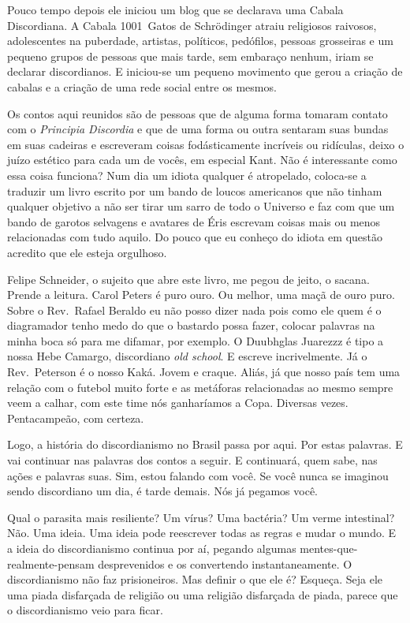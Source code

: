 Pouco tempo depois ele iniciou um blog que se declarava uma Cabala Discordiana. A Cabala 1001~Gatos de Schrödinger atraiu religiosos raivosos, adolescentes na puberdade, artistas, políticos, pedófilos, pessoas grosseiras e um pequeno grupos de pessoas que mais tarde, sem embaraço nenhum, iriam se declarar discordianos. E iniciou-se um pequeno movimento que gerou a criação de cabalas e a criação de uma rede social entre os mesmos.

Os contos aqui reunidos são de pessoas que de alguma forma tomaram contato com o \emph{Principia Discordia} e que de uma forma ou outra sentaram suas bundas em suas cadeiras e escreveram coisas fodásticamente incríveis ou ridículas, deixo o juízo estético para cada um de vocês, em especial Kant. Não é interessante como essa coisa funciona? Num dia um idiota qualquer é atropelado, coloca-se a traduzir um livro escrito por um bando de loucos americanos que não tinham qualquer objetivo a não ser tirar um sarro de todo o Universo e faz com que um bando de garotos selvagens e avatares de Éris escrevam coisas mais ou menos relacionadas com tudo aquilo. Do pouco que eu conheço do idiota em questão acredito que ele esteja orgulhoso.

Felipe Schneider, o sujeito que abre este livro, me pegou de jeito, o sacana. Prende a leitura. Carol Peters é puro ouro. Ou melhor, uma maçã de ouro puro. Sobre o Rev.~Rafael Beraldo eu não posso dizer nada pois como ele quem é o diagramador tenho medo do que o bastardo possa fazer, colocar palavras na minha boca só para me difamar, por exemplo. O Duubhglas Juarezzz é tipo a nossa Hebe Camargo, discordiano \foreignlanguage{english}{\emph{old school}}. E escreve incrivelmente. Já o Rev.~Peterson é o nosso Kaká. Jovem e craque. Aliás, já que nosso país tem uma relação com o futebol muito forte e as metáforas relacionadas ao mesmo sempre veem a calhar, com este time nós ganharíamos a Copa. Diversas vezes. Pentacampeão, com certeza.

Logo, a história do discordianismo no Brasil passa por aqui. Por estas palavras. E vai continuar nas palavras dos contos a seguir. E continuará, quem sabe, nas ações e palavras suas. Sim, estou falando com você. Se você nunca se imaginou sendo discordiano um dia, é tarde demais. Nós já pegamos você.

Qual o parasita mais resiliente? Um vírus? Uma bactéria? Um verme intestinal? Não. Uma ideia. Uma ideia pode reescrever todas as regras e mudar o mundo. E a ideia do discordianismo continua por aí, pegando algumas mentes-que-realmente-pensam desprevenidos e os convertendo instantaneamente. O discordianismo não faz prisioneiros. Mas definir o que ele é? Esqueça. Seja ele uma piada disfarçada de religião ou uma religião disfarçada de piada, parece que o discordianismo veio para ficar.

